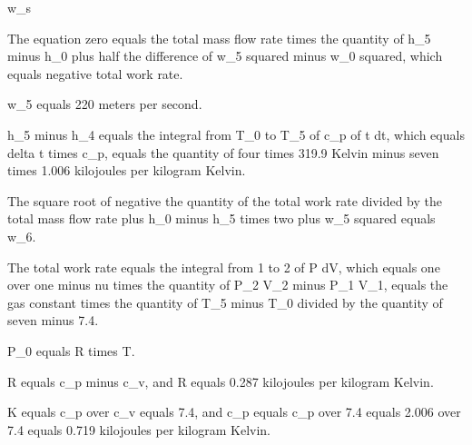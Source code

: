 w_s

The equation zero equals the total mass flow rate times the quantity of h_5 minus h_0 plus half the difference of w_5 squared minus w_0 squared, which equals negative total work rate.

w_5 equals 220 meters per second.

h_5 minus h_4 equals the integral from T_0 to T_5 of c_p of t dt, which equals delta t times c_p, equals the quantity of four times 319.9 Kelvin minus seven times 1.006 kilojoules per kilogram Kelvin.

The square root of negative the quantity of the total work rate divided by the total mass flow rate plus h_0 minus h_5 times two plus w_5 squared equals w_6.

The total work rate equals the integral from 1 to 2 of P dV, which equals one over one minus nu times the quantity of P_2 V_2 minus P_1 V_1, equals the gas constant times the quantity of T_5 minus T_0 divided by the quantity of seven minus 7.4.

P_0 equals R times T.

R equals c_p minus c_v, and R equals 0.287 kilojoules per kilogram Kelvin.

K equals c_p over c_v equals 7.4, and c_p equals c_p over 7.4 equals 2.006 over 7.4 equals 0.719 kilojoules per kilogram Kelvin.